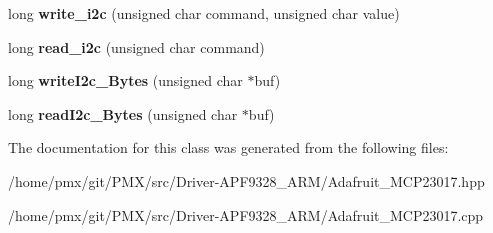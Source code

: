 \begin{DoxyCompactItemize}
long {\bfseries write\+\_\+i2c} (unsigned char command, unsigned char value)
\item 
\mbox{\label{classAdafruit__MCP23017_a5935341a99356efaf41556b5ee78cd5a}} 
long {\bfseries read\+\_\+i2c} (unsigned char command)
\item 
\mbox{\label{classAdafruit__MCP23017_a20fd3536424d0c91dba741894a010fd7}} 
long {\bfseries write\+I2c\+\_\+Bytes} (unsigned char $\ast$buf)
\item 
\mbox{\label{classAdafruit__MCP23017_a714df98feb9305f13d0895795f26e159}} 
long {\bfseries read\+I2c\+\_\+Bytes} (unsigned char $\ast$buf)
\end{DoxyCompactItemize}


The documentation for this class was generated from the following files\+:\begin{DoxyCompactItemize}
\item 
/home/pmx/git/\+P\+M\+X/src/\+Driver-\/\+A\+P\+F9328\+\_\+\+A\+R\+M/Adafruit\+\_\+\+M\+C\+P23017.\+hpp\item 
/home/pmx/git/\+P\+M\+X/src/\+Driver-\/\+A\+P\+F9328\+\_\+\+A\+R\+M/Adafruit\+\_\+\+M\+C\+P23017.\+cpp\end{DoxyCompactItemize}
